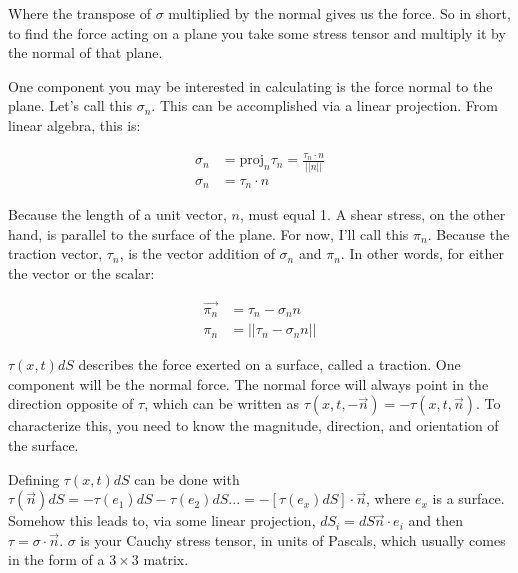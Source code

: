 Where the transpose of $\sigma$ multiplied by the normal gives us the force. So in short, to find the force acting on a plane you take some stress tensor and multiply it by the normal of that plane.\newline



One component you may be interested in calculating is the force normal to the plane. Let's call this $\sigma_n$. This can be accomplished via a linear projection. From linear algebra, this is: 


\begin{equation} \label{phenom1}
\begin{split}
\sigma_n &= \mathrm{proj}_n\tau_n = \frac{\tau_n \cdot n}{||n||}\\
\sigma_n &= \tau_n \cdot n
\end{split}
\end{equation}

Because the length of a unit vector, $n$, must equal 1. A shear stress, on the other hand, is parallel to the surface of the plane. For now, I'll call this $\pi_n$. Because the traction vector, $\tau_n$, is the vector addition of $\sigma_n$ and $\pi_n$. In other words, for either the vector or the scalar: 

\begin{equation} \label{phenom1}
\begin{split}
\Vec{\pi_n} &= \tau_n - \sigma_nn \\
\pi_n &= ||\tau_n - \sigma_nn ||
\end{split}
\end{equation}

$\tau(x,t)dS$ describes the force exerted on a surface, called a traction. One component will be the normal force. The normal force will always point in the direction opposite of $\tau$, which can be written as $\tau(x,t,-\Vec{n}) = -\tau(x,t,\Vec{n})$. To characterize this, you need to know the magnitude, direction, and orientation of the surface.\newline

Defining $\tau(x,t)dS$ can be done with $\tau(\Vec{n})dS = -\tau(e_1)dS - \tau(e_2)dS ... = -[\tau(e_x)dS]\cdot \Vec{n}$, where $e_x$ is a surface. Somehow this leads to, via some linear projection, $dS_i = dS \Vec{n}\cdot e_i$ and then $\tau = \sigma \cdot \Vec{n}$. $\sigma$ is your Cauchy stress tensor, in units of Pascals, which usually comes in the form of a $3\times3$ matrix. \newline 


